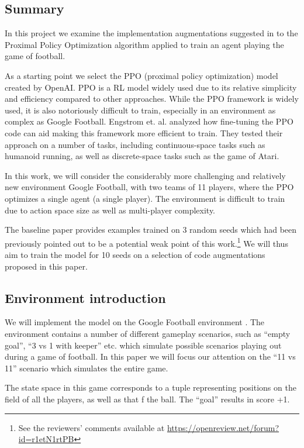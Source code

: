 \subsection*{Summary}\label{section_summary}

In this project we examine the implementation augmentations suggested in \cite{engstrom} to the Proximal Policy Optimization algorithm\cite{ppo} applied to train an agent playing the game of football.\cite{football}

As a starting point we select the PPO (proximal policy optimization) model created by OpenAI\cite{ppo}. PPO is a RL model widely used due to its relative simplicity and efficiency compared to other approaches.\cite{ppo} While the PPO framework is widely used, it is also notoriously difficult to train, especially in an environment as complex as Google Football. Engstrom et. al. \cite{engstrom} analyzed how fine-tuning the PPO code can aid making this framework more efficient to train. They tested their approach on a number of tasks, including continuous-space tasks such as humanoid running, as well as discrete-space tasks such as the game of Atari.

In this work, we will consider the considerably more challenging and relatively new environment Google Football, with two teams of 11 players, where the PPO optimizes a single agent (a single player). The environment is difficult to train due to action space size as well as multi-player complexity.

The baseline paper \cite{engstrom} provides examples trained on 3 random seeds which had been previously pointed out to be a potential weak point of this work.\footnote{See the reviewers' comments available at \url{https://openreview.net/forum?id=r1etN1rtPB}} We will thus aim to train the model for 10 seeds on a selection of code augmentations proposed in this paper.  

\subsection*{Environment introduction}\label{section_env}
We will implement the model on the Google Football environment \cite{football}. The environment contains a number of different gameplay scenarios, such as ``empty goal'', ``3 vs 1 with keeper'' etc. which simulate possible scenarios playing out during a game of football. In this paper we will focus our attention on the ``11 vs 11'' scenario which simulates the entire game.

The state space in this game corresponds to a tuple representing positions on the field of all the players, as well as that f the ball. The ``goal'' results in score +1.

